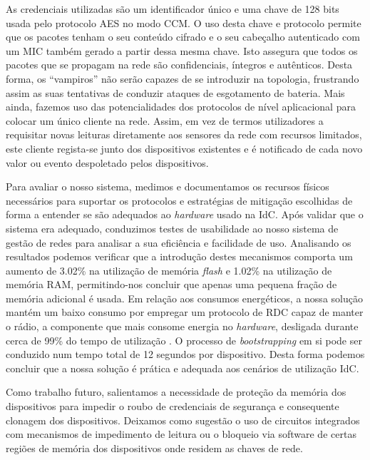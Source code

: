 \documentclass{llncs}
\begin{document}
As credenciais utilizadas são um identificador único e uma chave de 128 bits usada pelo protocolo \ac{AES} \cite{Fips2001} no modo \ac{CCM}.
O uso desta chave e protocolo permite que os pacotes tenham o seu conteúdo cifrado e o seu cabeçalho autenticado com um \ac{MIC} também gerado a partir dessa mesma chave. 
Isto assegura que todos os pacotes que se propagam na rede são confidenciais, íntegros e autênticos. 
Desta forma, os ``vampiros'' não serão capazes de se introduzir na topologia, frustrando assim as suas tentativas de conduzir ataques de esgotamento de bateria.
Mais ainda, fazemos uso das potencialidades dos protocolos de nível aplicacional para colocar um único cliente na rede. 
Assim, em vez de termos utilizadores a requisitar novas leituras diretamente aos sensores da rede com recursos limitados, este cliente regista-se junto dos dispositivos existentes e é notificado de cada novo valor ou evento despoletado pelos dispositivos.

Para avaliar o nosso sistema, medimos e documentamos os recursos físicos necessários para suportar os protocolos e estratégias de mitigação escolhidas de forma a entender se são adequados ao \textit{hardware} usado na \ac{IdC}. 
Após validar que o sistema era adequado, conduzimos testes de usabilidade ao nosso sistema de gestão de redes para analisar a sua eficiência e facilidade de uso.
Analisando os resultados podemos verificar que a introdução destes mecanismos comporta um aumento de 3.02\% na utilização de memória \textit{flash} e 1.02\% na utilização de memória \ac{RAM}, permitindo-nos concluir que apenas uma pequena fração de memória adicional é usada.
Em relação aos consumos energéticos, a nossa solução mantém um baixo consumo por empregar um protocolo de \ac{RDC} capaz de manter o rádio, a componente que mais consome energia no \textit{hardware}, desligada durante cerca de 99\% do tempo de utilização \cite{Dunkels2011}. 
O processo de \textit{bootstrapping} em si pode ser conduzido num tempo total de 12 segundos por dispositivo.
Desta forma podemos concluir que a nossa solução é prática e adequada aos cenários de utilização \ac{IdC}.

Como trabalho futuro, salientamos a necessidade de proteção da memória dos dispositivos para impedir o roubo de credenciais de segurança e consequente clonagem dos dispositivos. 
Deixamos como sugestão o uso de circuitos integrados com mecanismos de impedimento de leitura ou o bloqueio via software de certas regiões de memória dos dispositivos onde residem as chaves de rede.
%
\end{document}
